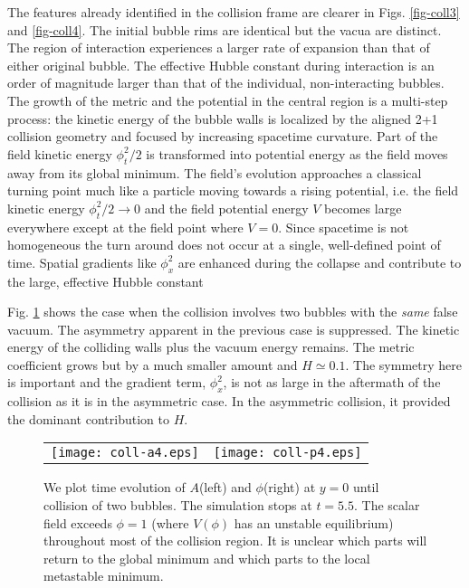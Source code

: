 \documentclass[preprintnumbers,eqsecnum,aps,prd,epsf,showpacs,nofootinbib
]{revtex4}
\begin{document}
The features already identified in the collision frame are clearer in
Figs. \ref{fig-coll3} and \ref{fig-coll4}. The initial bubble rims are
identical but the vacua are distinct.  The region of interaction
experiences a larger rate of expansion than that of either original
bubble. The effective Hubble constant during interaction is an order
of magnitude larger than that of the individual, non-interacting
bubbles.  The growth of the metric and the potential in the central
region is a multi-step process: the kinetic energy of the bubble walls
is localized by the aligned 2+1 collision geometry and focused by
increasing spacetime curvature. Part of the field kinetic energy
$\phi_t^2/2$ is transformed into potential energy as the field moves
away from its global minimum. The field's evolution approaches a
classical turning point much like a particle moving towards a rising
potential, i.e. the field kinetic energy $\phi_t^2/2 \to 0$ and the
field potential energy $V$ becomes large everywhere except at the
field point where $V=0$. Since spacetime is not homogeneous the turn
around does not occur at a single, well-defined point of time.
Spatial gradients like $\phi_x^2$ are enhanced during the collapse and
contribute to the large, effective Hubble constant
  
Fig. \ref{fig-coll5} shows the case when the collision involves two
bubbles with the {\it same} false vacuum. The asymmetry apparent in
the previous case is suppressed. The kinetic energy of the colliding
walls plus the vacuum energy remains. The metric coefficient grows but
by a much smaller amount and $H\simeq 0.1$. The symmetry here is
important and the gradient term, $\phi_x^2$, is not as large in the
aftermath of the collision as it is in the asymmetric case. In the
asymmetric collision, it provided the dominant contribution to $H$.
\begin{figure}[htbp]
\begin{center}
\begin{tabular}{ll}
\texttt{[image: coll-a4.eps]} &
\hspace{0.5cm}
\texttt{[image: coll-p4.eps]}
\end{tabular}
\end{center}
\caption{We plot time evolution of $A$(left) and $\phi$(right) at $y=0$ 
until collision of two bubbles. The simulation stops at $t=5.5$.  
The scalar field exceeds $\phi=1$ (where $V(\phi)$ has an unstable
equilibrium) throughout most of the collision region. It is unclear which
parts will return to the global minimum and which parts to the local
metastable minimum.}
\label{fig-coll5}
\end{figure}
\end{document}
